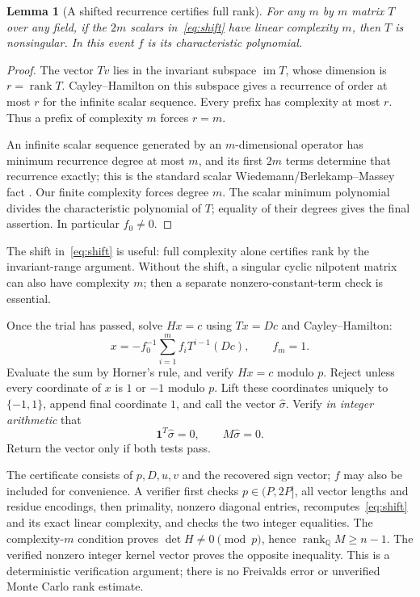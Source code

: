 \documentclass[11pt]{article}
\newtheorem{lemma}[theorem]{Lemma}
\newcommand{\one}{\boldsymbol 1}
\newcommand{\rank}{\operatorname{rank}}
\begin{document}
\begin{lemma}[A shifted recurrence certifies full rank]\label{lem:cert}
For any $m$ by $m$ matrix $T$ over any field, if the $2m$ scalars
in~\eqref{eq:shift} have linear complexity $m$, then $T$ is
nonsingular. In this event $f$ is its characteristic polynomial.
\end{lemma}
\begin{proof}
The vector $Tv$ lies in the invariant subspace $\operatorname{im}T$,
whose dimension is $r=\rank T$. Cayley--Hamilton on this subspace
gives a recurrence of order at most $r$ for the infinite scalar
sequence. Every prefix has complexity at most $r$. Thus a prefix
of complexity $m$ forces $r=m$.

An infinite scalar sequence generated by an $m$-dimensional operator
has minimum recurrence degree at most $m$, and its first $2m$ terms
determine that recurrence exactly; this is the standard scalar
Wiedemann/Berlekamp--Massey fact \cite[Section II]{wiedemann}.
Our finite complexity forces degree $m$. The scalar minimum polynomial
divides the characteristic polynomial of $T$; equality of their
degrees gives the final assertion. In particular $f_0\ne0$.
\end{proof}

The shift in~\eqref{eq:shift} is useful: full complexity alone
certifies rank by the invariant-range argument. Without the shift,
a singular cyclic nilpotent matrix can also have complexity $m$;
then a separate nonzero-constant-term check is essential.

Once the trial has passed, solve $Hx=c$ using $Tx=Dc$ and
Cayley--Hamilton:
\begin{equation}\label{eq:solve}
 x=-f_0^{-1}\sum_{i=1}^m f_iT^{i-1}(Dc),\qquad f_m=1.
\end{equation}
Evaluate the sum by Horner's rule, and verify $Hx=c$ modulo $p$.
Reject unless every coordinate of $x$ is $1$ or $-1$ modulo $p$.
Lift these coordinates uniquely to $\{-1,1\}$, append final coordinate
$1$, and call the vector $\widehat\sigma$.
Verify \emph{in integer arithmetic} that
\[
 \one^T\widehat\sigma=0,\qquad M\widehat\sigma=0.
\]
Return the vector only if both tests pass.

The certificate consists of $p,D,u,v$ and the recovered sign vector;
$f$ may also be included for convenience. A verifier first checks
$p\in(P,2P]$, all vector lengths and residue encodings, then primality,
nonzero diagonal entries, recomputes~\eqref{eq:shift} and its exact
linear complexity, and checks the two integer equalities.
The complexity-$m$ condition proves $\det H\ne0\pmod p$, hence
$\rank_{\mathbb Q}M\ge n-1$. The verified nonzero integer kernel
vector proves the opposite inequality. This is a deterministic
verification argument; there is no Freivalds error or unverified
Monte Carlo rank estimate.
\end{document}
